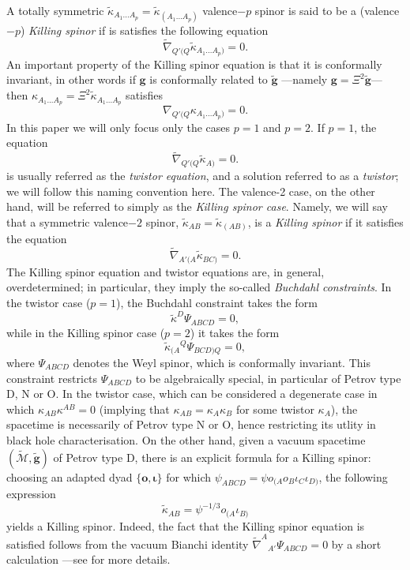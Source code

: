 \documentclass[10pt,a4paper]{article}
\theoremstyle{plain}
\def\bmg{{\bm g}}
\def\bmo{{\bm o}}
\begin{document}
A totally symmetric
$\tilde{\kappa}_{A_1...A_p}=\tilde{\kappa}_{(A_1...A_p)}$ valence$-p$
spinor is said to be a (valence$-p$) \emph{Killing spinor} if is
satisfies the following equation
\begin{equation}\label{qValenceKillingspinor}
\tilde{\nabla}_{Q'(Q}\tilde{\kappa}_{A_1...A_p)}=0.
\end{equation}
An important property of the Killing spinor equation is that it is
conformally invariant, in other words if $\bmg$ is conformally related
to $\tilde{\bmg}$ ---namely $\bmg=\Xi^2\tilde{\bmg}$--- then
${\kappa}_{A_1...A_p}=\Xi^2 \tilde{\kappa}_{A_1...A_p}$ satisfies
\begin{equation}\label{UnphysicalqValenceKillingspinor}
  {\nabla}_{Q'(Q}{\kappa}_{A_1...A_p)}=0.
\end{equation}
\medskip
\noindent In this paper we will only focus only the cases $p=1$ and
$p=2$.  If $p=1$, the equation
\begin{equation}\label{TwistorEq}
  \tilde{\nabla}_{Q'(Q}\tilde{\kappa}_{A)}=0.
\end{equation}
is usually referred as the \emph{twistor equation}, and a solution
referred to as a \emph{twistor}; we will follow this naming convention
here.  The valence-2 case, on the other hand, will be referred to
simply as the \emph{Killing spinor case}.  Namely, we will say that a
symmetric valence$-2$ spinor,
$\tilde{\kappa}_{AB}=\tilde{\kappa}_{(AB)}$, is a \textit{Killing
  spinor} if it satisfies the equation
\begin{equation}
\tilde{\nabla}_{A'(A}\tilde{\kappa}_{BC)}=0.
\end{equation}
The Killing spinor equation and twistor equations are, in general,
overdetermined; in particular, they imply the so-called
\textit{Buchdahl constraints}.  In the twistor case ($p=1$), the Buchdahl constraint takes
the form
\[
\tilde{\kappa}^D\Psi_{ABCD}=0,
\]
while in the Killing spinor case ($p=2$) it takes the form
\[
\tilde{\kappa}_{(A}{}^Q\Psi_{BCD)Q}=0,
\]
where $\Psi_{ABCD}$ denotes the Weyl spinor, which is conformally invariant.
This constraint restricts $\Psi_{ABCD}$ to be algebraically special, in particular of Petrov type D, N or O. In the twistor case, which can be considered a degenerate case in which $\kappa_{AB}\kappa^{AB}=0$ (implying that $\kappa_{AB}=\kappa_A\kappa_B$ for some twistor $\kappa_A$), the spacetime is necessarily of Petrov type N or
O, hence restricting its utlity in black
hole characterisation. On the other hand, given a vacuum spacetime $(\tilde{\mathcal{M}},\tilde{\bmg})$ of Petrov type D,
there is an explicit
formula for a Killing spinor: choosing an adapted dyad $\lbrace \bmo,
\bm\iota\rbrace$ for which $\psi_{ABCD}=\psi
o_{(A}o_{B}\iota_C\iota_{D)}$, the following expression
\[\tilde{\kappa}_{AB} = \psi^{-1/3}o_{(A}\iota_{B)}\]
yields a Killing spinor. Indeed, the fact that the Killing spinor equation is
satisfied follows from the vacuum Bianchi identity
$\tilde{\nabla}^A{}_{A'}\Psi_{ABCD}=0$ by a short calculation ---see
\cite{PenRin84, WalkerPenrose70} for more details.
\medskip
\end{document}
